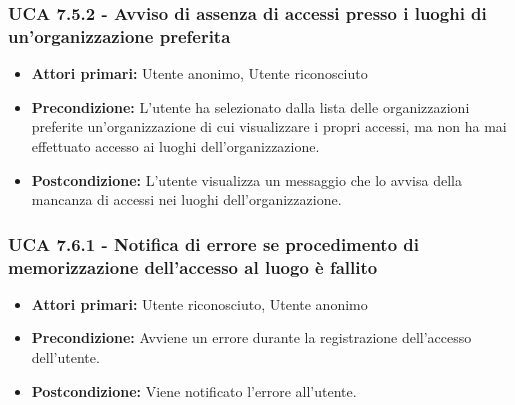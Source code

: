 \subsubsection{UCA 7.5.2 - Avviso di assenza di accessi presso i luoghi di un'organizzazione preferita}
\begin{itemize}
    \item \textbf{Attori primari:} Utente anonimo, Utente riconosciuto
    \item \textbf{Precondizione:} L'utente ha selezionato dalla lista delle organizzazioni preferite un'organizzazione di cui visualizzare i propri accessi, ma non ha mai effettuato accesso ai luoghi dell'organizzazione.
    \item \textbf{Postcondizione:} L'utente visualizza un messaggio che lo avvisa della mancanza di accessi nei luoghi dell'organizzazione.
\end{itemize}

\subsubsection{UCA 7.6.1 - Notifica di errore se procedimento di memorizzazione dell'accesso al luogo è fallito}
\begin{itemize}
	\item \textbf{Attori primari:} Utente riconosciuto, Utente anonimo
	\item \textbf{Precondizione:} Avviene un errore durante la registrazione dell'accesso dell'utente.
	\item \textbf{Postcondizione:} Viene notificato l'errore all'utente.
\end{itemize}